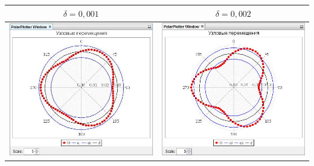 \documentclass[14pt,oneside,final]{extreport}
\begin{document}
\begin{table}[h!]
{{\begin{tabu}[]{|c|c|}
					\hline
					$ \delta = 0,001 $ & 	$ \delta = 0,002 $ \\ \hline
					\includegraphics[scale=0.55]{img/simulation-displ-test-graph1} & \includegraphics[scale=0.55]{img/simulation-displ-test-graph2} \\ 
					\hline
				\end{tabu}
			}
	}\end{table}	 
	
\end{document}
